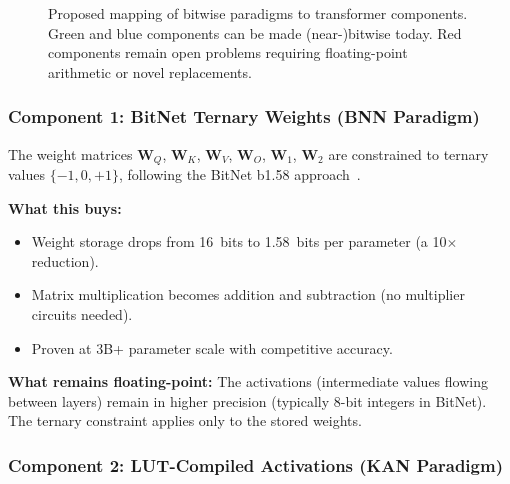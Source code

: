 \begin{figure}[htbp]
\caption{Proposed mapping of bitwise paradigms to transformer
  components. Green and blue components can be made (near-)bitwise
  today. Red components remain open problems requiring floating-point
  arithmetic or novel replacements.}
\label{fig:combined-architecture}
\end{figure}

\subsubsection{Component 1: BitNet Ternary Weights (BNN Paradigm)}

The weight matrices $\bm{W}_Q$, $\bm{W}_K$, $\bm{W}_V$,
$\bm{W}_O$, $\bm{W}_1$, $\bm{W}_2$ are constrained to ternary
values $\{-1, 0, +1\}$, following the BitNet b1.58
approach~\cite{ma2024bitnet}.

\textbf{What this buys:}
\begin{itemize}[leftmargin=2em]
  \item Weight storage drops from 16~bits to 1.58~bits per parameter
    (a 10$\times$ reduction).
  \item Matrix multiplication becomes addition and subtraction (no
    multiplier circuits needed).
  \item Proven at 3B+ parameter scale with competitive accuracy.
\end{itemize}

\textbf{What remains floating-point:} The activations (intermediate
values flowing between layers) remain in higher precision (typically
8-bit integers in BitNet). The ternary constraint applies only to the
stored weights.

\subsubsection{Component 2: LUT-Compiled Activations (KAN Paradigm)}

